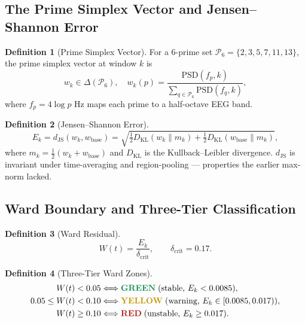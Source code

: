 \documentclass[12pt,a4paper]{article}
\theoremstyle{definition}
\newtheorem{definition}{Definition}[section]
\newcommand{\dJS}{d_{\mathrm{JS}}}
\newcommand{\wbase}{w_{\mathrm{base}}}
\begin{document}
\subsection{The Prime Simplex Vector and Jensen--Shannon Error}

\begin{definition}[Prime Simplex Vector]
  For a 6-prime set $\mathcal{P}_6 = \{2,3,5,7,11,13\}$, the prime
  simplex vector at window $k$ is
  \begin{equation}
    w_k \in \Delta(\mathcal{P}_6),
    \quad w_k(p) = \frac{\mathrm{PSD}(f_p, k)}
      {\sum_{q \in \mathcal{P}_6} \mathrm{PSD}(f_q, k)},
  \end{equation}
  where $f_p = 4\log p$ Hz maps each prime to a half-octave EEG band.
\end{definition}

\begin{definition}[Jensen--Shannon Error]
  \begin{equation}
    E_k = \dJS(w_k, \wbase)
      = \sqrt{\tfrac{1}{2} D_{\mathrm{KL}}(w_k \| m_k)
             + \tfrac{1}{2} D_{\mathrm{KL}}(\wbase \| m_k)},
  \end{equation}
  where $m_k = \tfrac{1}{2}(w_k + \wbase)$ and $D_{\mathrm{KL}}$ is the
  Kullback--Leibler divergence.  $\dJS$ is invariant under time-averaging
  and region-pooling — properties the earlier max-norm lacked.
\end{definition}

\subsection{Ward Boundary and Three-Tier Classification}

\begin{definition}[Ward Residual]
  \begin{equation}
    W(t) = \frac{E_k}{\delta_\mathrm{crit}}, \qquad \delta_\mathrm{crit} = 0.17.
  \end{equation}
\end{definition}

\begin{definition}[Three-Tier Ward Zones]
  \begin{align}
    W(t) < 0.05 &\Longleftrightarrow \textcolor{orfgreen}{\textbf{GREEN}} \;
      (\text{stable, }E_k < 0.0085), \\
    0.05 \leq W(t) < 0.10 &\Longleftrightarrow \textcolor{orfyellow}{\textbf{YELLOW}} \;
      (\text{warning, }E_k \in [0.0085, 0.017)), \\
    W(t) \geq 0.10 &\Longleftrightarrow \textcolor{orfred}{\textbf{RED}} \;
      (\text{unstable, }E_k \geq 0.017).
  \end{align}
\end{definition}
\end{document}
